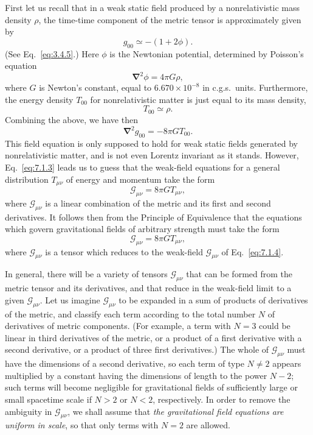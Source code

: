 First let us recall that in a weak static field produced by a nonrelativistic
mass density \(\rho\), the time-time component of the metric tensor is
approximately given by
\[
  g_{00}\simeq-(1+2\phi).
\]
(See Eq.~\eqref{eq:3.4.5}.) Here \(\phi\) is the Newtonian potential,
determined by Poisson's equation
\[
  \boldsymbol{\nabla}^{2}\phi=4\pi G\rho,
\]
where \(G\) is Newton's constant, equal to
\(6.670\times10^{-8}\) in c.g.s.\ units. Furthermore, the energy density
\(T_{00}\) for nonrelativistic matter is just equal to its mass density,
\[
  T_{00}\simeq\rho.
\]
Combining the above, we have then
\begin{equation}
  \boldsymbol{\nabla}^{2}g_{00}=-8\pi G T_{00}.
  \tag{7.1.3}\label{eq:7.1.3}
\end{equation}
This field equation is only supposed to hold for weak static fields generated
by nonrelativistic matter, and is not even Lorentz invariant as it stands.
However, Eq.~\eqref{eq:7.1.3} leads us to guess that the weak-field equations
for a general distribution \(T_{\mu\nu}\) of energy and momentum take the
form
\begin{equation}
  \mathcal G_{\mu\nu}=8\pi G T_{\mu\nu},
  \tag{7.1.4}\label{eq:7.1.4}
\end{equation}
where \(\mathcal G_{\mu\nu}\) is a linear combination of the metric and its
first and second derivatives. It follows then from the Principle of
Equivalence that the equations which govern gravitational fields of arbitrary
strength must take the form
\begin{equation}
  \mathcal G_{\mu\nu}=8\pi G T_{\mu\nu},
  \tag{7.1.5}\label{eq:7.1.5}
\end{equation}
where \(\mathcal G_{\mu\nu}\) is a tensor which reduces to the weak-field
\(\mathcal G_{\mu\nu}\) of Eq.~\eqref{eq:7.1.4}.

In general, there will be a variety of tensors \(\mathcal G_{\mu\nu}\) that
can be formed from the metric tensor and its derivatives, and that reduce in
the weak-field limit to a given \(\mathcal G_{\mu\nu}\). Let us imagine
\(\mathcal G_{\mu\nu}\) to be expanded in a sum of products of derivatives of
the metric, and classify each term according to the total number \(N\) of
derivatives of metric components. (For example, a term with \(N=3\) could be
linear in third derivatives of the metric, or a product of a first derivative
with a second derivative, or a product of three first derivatives.) The whole
of \(\mathcal G_{\mu\nu}\) must have the dimensions of a second derivative, so
each term of type \(N\ne2\) appears multiplied by a constant having the
dimensions of length to the power \(N-2\); such terms will become negligible
for gravitational fields of sufficiently large or small spacetime scale if
\(N>2\) or \(N<2\), respectively. In order to remove the ambiguity in
\(\mathcal G_{\mu\nu}\), we shall assume that \emph{the gravitational field
equations are uniform in scale}, so that only terms with \(N=2\) are allowed.

